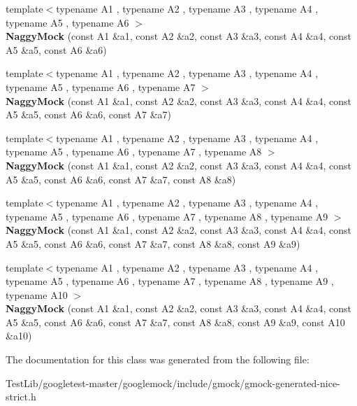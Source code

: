 \begin{DoxyCompactItemize}
\item 
\mbox{\label{classtesting_1_1NaggyMock_aac4c0986e917a5d6e515f8dc0e7bf644}} 
{\footnotesize template$<$typename A1 , typename A2 , typename A3 , typename A4 , typename A5 , typename A6 $>$ }\\{\bfseries Naggy\+Mock} (const A1 \&a1, const A2 \&a2, const A3 \&a3, const A4 \&a4, const A5 \&a5, const A6 \&a6)
\item 
\mbox{\label{classtesting_1_1NaggyMock_ad1edac1991dd20514e822c90d6896c74}} 
{\footnotesize template$<$typename A1 , typename A2 , typename A3 , typename A4 , typename A5 , typename A6 , typename A7 $>$ }\\{\bfseries Naggy\+Mock} (const A1 \&a1, const A2 \&a2, const A3 \&a3, const A4 \&a4, const A5 \&a5, const A6 \&a6, const A7 \&a7)
\item 
\mbox{\label{classtesting_1_1NaggyMock_a63b30506f56b792ffbdc5792a9630d5e}} 
{\footnotesize template$<$typename A1 , typename A2 , typename A3 , typename A4 , typename A5 , typename A6 , typename A7 , typename A8 $>$ }\\{\bfseries Naggy\+Mock} (const A1 \&a1, const A2 \&a2, const A3 \&a3, const A4 \&a4, const A5 \&a5, const A6 \&a6, const A7 \&a7, const A8 \&a8)
\item 
\mbox{\label{classtesting_1_1NaggyMock_a786f31ade7b8b9f6e78e07f51cc0e14b}} 
{\footnotesize template$<$typename A1 , typename A2 , typename A3 , typename A4 , typename A5 , typename A6 , typename A7 , typename A8 , typename A9 $>$ }\\{\bfseries Naggy\+Mock} (const A1 \&a1, const A2 \&a2, const A3 \&a3, const A4 \&a4, const A5 \&a5, const A6 \&a6, const A7 \&a7, const A8 \&a8, const A9 \&a9)
\item 
\mbox{\label{classtesting_1_1NaggyMock_aa40a39806b939f423696f9380de3172b}} 
{\footnotesize template$<$typename A1 , typename A2 , typename A3 , typename A4 , typename A5 , typename A6 , typename A7 , typename A8 , typename A9 , typename A10 $>$ }\\{\bfseries Naggy\+Mock} (const A1 \&a1, const A2 \&a2, const A3 \&a3, const A4 \&a4, const A5 \&a5, const A6 \&a6, const A7 \&a7, const A8 \&a8, const A9 \&a9, const A10 \&a10)
\end{DoxyCompactItemize}


The documentation for this class was generated from the following file\+:\begin{DoxyCompactItemize}
\item 
Test\+Lib/googletest-\/master/googlemock/include/gmock/gmock-\/generated-\/nice-\/strict.\+h\end{DoxyCompactItemize}
